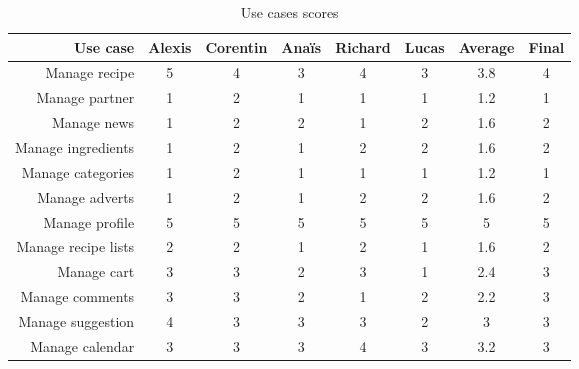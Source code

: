 \begin{table}[h]
  \centering
  \begin{tabular}{rccccccc}
    \toprule
    \textbf{Use case}   & \textbf{Alexis} & \textbf{Corentin} & \textbf{Anaïs} & \textbf{Richard} & \textbf{Lucas} & \textbf{Average} & \textbf{Final} \\
    \midrule
    Manage recipe       & 5               & 4                 & 3              & 4                & 3              & 3.8              & 4              \\
    Manage partner      & 1               & 2                 & 1              & 1                & 1              & 1.2              & 1              \\
    Manage news         & 1               & 2                 & 2              & 1                & 2              & 1.6              & 2              \\
    Manage ingredients  & 1               & 2                 & 1              & 2                & 2              & 1.6              & 2              \\
    Manage categories   & 1               & 2                 & 1              & 1                & 1              & 1.2              & 1              \\
    Manage adverts      & 1               & 2                 & 1              & 2                & 2              & 1.6              & 2              \\
    Manage profile      & 5               & 5                 & 5              & 5                & 5              & 5                & 5              \\
    Manage recipe lists & 2               & 2                 & 1              & 2                & 1              & 1.6              & 2              \\
    Manage cart         & 3               & 3                 & 2              & 3                & 1              & 2.4              & 3              \\
    Manage comments     & 3               & 3                 & 2              & 1                & 2              & 2.2              & 3              \\
    Manage suggestion   & 4               & 3                 & 3              & 3                & 2              & 3                & 3              \\
    Manage calendar     & 3               & 3                 & 3              & 4                & 3              & 3.2              & 3              \\
    \bottomrule
  \end{tabular}
  \caption{Use cases scores}
\end{table}

